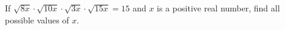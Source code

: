 If $\sqrt{8x}\cdot\sqrt{10x}\cdot\sqrt{3x}\cdot\sqrt{15x}=15$ and $x$ is a positive real number, find all possible values of $x$.
